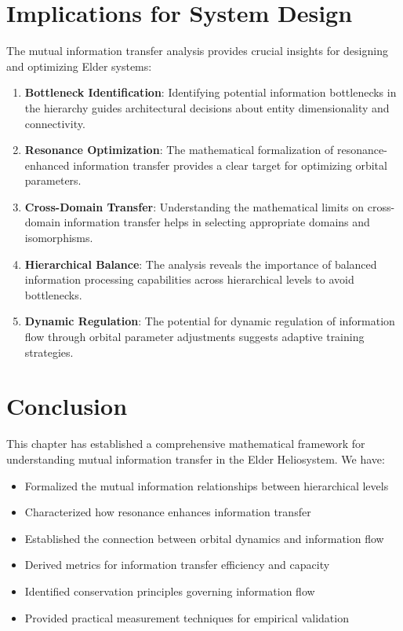 \section{Implications for System Design}

The mutual information transfer analysis provides crucial insights for designing and optimizing Elder systems:

\begin{enumerate}
    \item \textbf{Bottleneck Identification}: Identifying potential information bottlenecks in the hierarchy guides architectural decisions about entity dimensionality and connectivity.
    
    \item \textbf{Resonance Optimization}: The mathematical formalization of resonance-enhanced information transfer provides a clear target for optimizing orbital parameters.
    
    \item \textbf{Cross-Domain Transfer}: Understanding the mathematical limits on cross-domain information transfer helps in selecting appropriate domains and isomorphisms.
    
    \item \textbf{Hierarchical Balance}: The analysis reveals the importance of balanced information processing capabilities across hierarchical levels to avoid bottlenecks.
    
    \item \textbf{Dynamic Regulation}: The potential for dynamic regulation of information flow through orbital parameter adjustments suggests adaptive training strategies.
\end{enumerate}

\section{Conclusion}

This chapter has established a comprehensive mathematical framework for understanding mutual information transfer in the Elder Heliosystem. We have:

\begin{itemize}
    \item Formalized the mutual information relationships between hierarchical levels
    \item Characterized how resonance enhances information transfer
    \item Established the connection between orbital dynamics and information flow
    \item Derived metrics for information transfer efficiency and capacity
    \item Identified conservation principles governing information flow
    \item Provided practical measurement techniques for empirical validation
\end{itemize}

